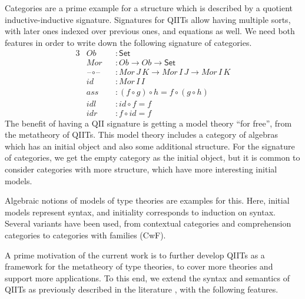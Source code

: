\documentclass{article}
\theoremstyle{definition}
\theoremstyle{theorem}
\newcommand{\blank}{\mathord{\hspace{1pt}\text{--}\hspace{1pt}}}
\newcommand{\ra}{\rightarrow}
\newcommand{\Set}{\mathsf{Set}}
\newcommand{\mi}[1]{\mathit{#1}}
\begin{document}
Categories are a prime example for a structure which is described by a
quotient inductive-inductive signature. Signatures for QIITs allow
having multiple sorts, with later ones indexed over previous ones, and
equations as well. We need both features in order to write down the
following signature of categories.
\begingroup
\allowdisplaybreaks
\begin{alignat*}{3}
  & \mi{Ob}  && : \Set \\
  & \mi{Mor} && : \mi{Ob}\ra \mi{Ob}\ra\Set \\
  & \blank\circ\blank && : \mi{Mor}\,J\,K\ra \mi{Mor}\,I\,J\ra \mi{Mor}\,I\,K \\
  & \mi{id} && : \mi{Mor}\,I\,I \\
  & \mi{ass} && : (f\circ g)\circ h = f\circ(g\circ h) \\
  & \mi{idl} && : \mi{id}\circ f = f \\
  & \mi{idr} && : f\circ \mi{id} = f
\end{alignat*}
\endgroup
The benefit of having a QII signature is getting a model theory ``for free'',
from the metatheory of QIITs. This model theory includes a category of algebras
which has an initial object and also some additional structure. For the
signature of categories, we get the empty category as the initial object, but it
is common to consider categories with more structure, which have more
interesting initial models.

Algebraic notions of models of type theories are examples for this. Here,
initial models represent syntax, and initiality corresponds to induction on
syntax. Several variants have been used, from contextual categories \cite{gat}
and comprehension categories \cite{jacobs1993comprehension} to categories with
families \cite{internaltt} (CwF).

A prime motivation of the current work is to further develop QIITs as a
framework for the metatheory of type theories, to cover more theories and
support more applications. To this end, we extend the syntax and semantics of
QIITs as previously described in the literature \cite{kaposi2019constructing,
  qiits, dijkstra2017quotient}, with the following features.
\end{document}
